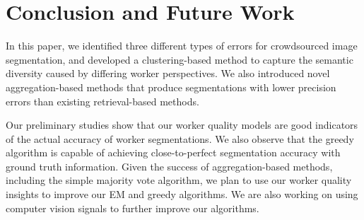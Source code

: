 \vspace{-10pt}
\section{Conclusion and Future Work}
In this paper, we identified three different types of errors for crowdsourced image segmentation, and developed a clustering-based method to capture the semantic diversity caused by differing worker perspectives. We also introduced novel aggregation-based methods that produce segmentations with lower precision errors than existing retrieval-based methods.
\par Our preliminary studies show that our worker quality models are good indicators of the actual accuracy of worker segmentations. We also observe that the greedy algorithm is capable of achieving close-to-perfect segmentation accuracy with ground truth information. 
Given the success of aggregation-based methods, including the simple majority vote algorithm, we plan to use our worker quality insights to improve our EM and greedy algorithms. 
We are also working on using computer vision signals to further improve our algorithms.
